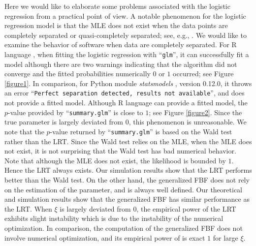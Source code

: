 \documentclass[11pt]{article}
\theoremstyle{plain}
\theoremstyle{definition}
\theoremstyle{remark}
\begin{document}
Here we would like to elaborate some problems associated with the logistic regression from a practical point of view.
A notable phenomenon for the logistic regression model is that the MLE does not exist when the data points are completely separated or quasi-completely separated; see, e.g., \cite{Albert1984On,Candes2020The_phase}.
We would like to examine the behavior of software when data are completely separated.
For R language \citep{R2020}, when fitting the logistic regression with ``\texttt{glm}'', it can successfully fit a model although there are two warnings indicating that the algorithm did not converge and the fitted probabilities numerically $0$ or $1$ occurred; see Figure \ref{figure1}.
In comparison, for Python module \emph{statsmodels} \cite{seabold-proc-scipy-2010}, version 0.12.0, it throws an error  ``\texttt{Perfect separation detected, results not available}'', and does not provide a fitted model.
Although R language can provide a fitted model, the $p$-value provided by ``\texttt{summary.glm}'' is close to $1$; see Figure \ref{figure2}.
Since the true parameter is largely deviated from $0$, this phenomenon is unreasonable.
We note that the $p$-value returned by ``\texttt{summary.glm}'' is based on the Wald test rather than the LRT. 
Since the Wald test relies on the MLE,  when the MLE does not exist, it is not surprising that the Wald test has bad numerical behavior.
Note that although the MLE does not exist, the likelihood is bounded by $1$.
Hence the LRT always exists.
Our simulation results show that the LRT performs better than the Wald test.
On the other hand, the generalized FBF does not rely on the estimation of the parameter, and is always well defined.
Our theoretical and simulation results show that the generalized FBF has similar performance as the LRT.
When $\xi$ is largely deviated from $0$, the empirical power of the LRT exhibits slight instability which is due to the instability of the numerical optimization.
In comparison, the computation of the generalized FBF does not involve numerical optimization,  and its  empirical power of is exact $1$ for large $\xi$. 
\end{document}
